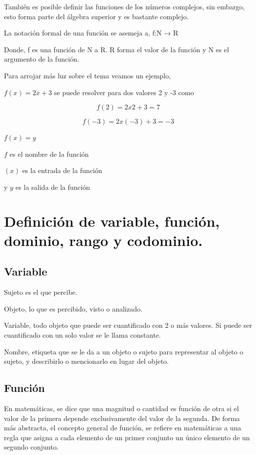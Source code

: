 \documentclass[oneside,spanish,letterpaper]{extbook}
\theoremstyle{mythmstyle}
\begin{document}
También es posible definir las funciones de los números complejos, sin embargo, esto forma parte
del álgebra superior y es bastante complejo.

La notación formal de una función se asemeja a, f:N → R

Donde, f es una función de N a R. R forma el valor de la función y N es el argumento de la función.

Para arrojar más luz sobre el tema veamos un ejemplo,

$f(x) = 2x + 3$ se puede resolver para dos valores 2 y -3 como

$$f(2) = 2 x 2 + 3 =7$$

$$f(-3) = 2 x (-3) + 3 = -3$$

$f(x)=y$

$f$ es el nombre de la función

$(x)$ es la entrada de la función

y $y$ es la salida de la función\cite{cd1}

\section{Definición de variable, función, dominio, rango y codominio.}
\subsection{Variable}
\begin{description}
 \item Sujeto es el que percibe.
 
\item Objeto, lo que es percibido, visto o analizado.
\item Variable, todo objeto que puede ser cuantificado con 2 o más valores. Si puede ser cuantificado con un solo valor
se le llama constante.
\item Nombre, etiqueta que se le da a un objeto o sujeto para representar al objeto o sujeto,
y describirlo o mencionarlo en lugar del objeto.

\end{description}


\subsection{Función} 

En matemáticas, se dice que una magnitud o cantidad es función de otra si el valor de la primera depende
exclusivamente del valor de la segunda.
De forma más abstracta, el concepto general de función,  se refiere en matemáticas a una regla que asigna
a cada elemento de un primer conjunto un único elemento de un segundo conjunto.
\end{document}
